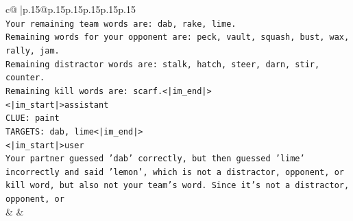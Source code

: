 \documentclass{article}
\begin{document}
{\begin{supertabular}{c@{$\;$}|p{.15\linewidth}@{}p{.15\linewidth}p{.15\linewidth}p{.15\linewidth}p{.15\linewidth}p{.15\linewidth}}
{{{\\ 
\texttt{Your remaining team words are: dab, rake, lime.} \\
\texttt{Remaining words for your opponent are: peck, vault, squash, bust, wax, rally, jam.} \\
\texttt{Remaining distractor words are: stalk, hatch, steer, darn, stir, counter.} \\
\texttt{Remaining kill words are: scarf.<|im\_end|>} \\
\texttt{<|im\_start|>assistant} \\
\texttt{CLUE: paint} \\
\texttt{TARGETS: dab, lime<|im\_end|>} \\
\texttt{<|im\_start|>user} \\
\texttt{Your partner guessed 'dab' correctly, but then guessed 'lime' incorrectly and said 'lemon', which is not a distractor, opponent, or kill word, but also not your team's word. Since it's not a distractor, opponent, or} \\
            }
        }
    }
    & & \\ \\


\end{supertabular}}
\end{document}
